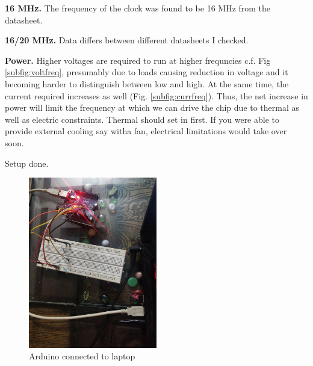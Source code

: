 
\begin{arabicparts}
    \questionpart
    \textbf{16 MHz.} The frequency of the clock was found to
    be 16 MHz from the datasheet. 

    \questionpart
    \textbf{16/20 MHz.} Data differs between different datasheets
    I checked. 

    \questionpart
    \textbf{Power.} Higher voltages are required to run at higher frequncies c.f. Fig \ref{subfig:voltfreq},
    presumably due to loads causing reduction in voltage and it becoming 
    harder to distinguish between low and high. At the same time, the current
    required increases as well (Fig. \ref{subfig:currfreq}). Thus, the net increase 
    in power will limit the frequency at which we can drive the chip due to thermal
    as well as electric constraints. Thermal should set in first. If you were able
    to provide external cooling say witha  fan, electrical limitations would take over 
    soon.

    \questionpart
    Setup done.

    \begin{figure}[ht]
        \centering
        \includegraphics[width=0.5\textwidth]{fig/arduinoconnected-min.jpg}
        \caption{Arduino connected to laptop}
        \label{fig:arduinoconnected}
    \end{figure}



\end{arabicparts}
